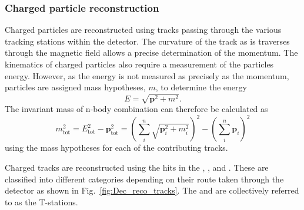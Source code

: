 \subsubsection{Charged particle reconstruction}
Charged particles are reconstructed using tracks passing through the various tracking stations within the \lhcb detector. The curvature of the track as is traverses through the magnetic field allows a precise determination of the momentum. The kinematics of charged particles also require a measurement of the particles energy. However, as the energy is not measured as precisely as the momentum, particles are assigned mass hypotheses, $m$, to determine the energy
\begin{equation}
E = \sqrt{\boldsymbol{p}^{2}+m^{2}}.
\end{equation} 
The invariant mass of n-body combination can therefore be calculated as
\begin{equation}
m^{2}_\text{tot} = E_{\text{tot}}^{2} - \boldsymbol{p}_\text{tot}^2 = \left(\sum^{n}_{i} \sqrt{\boldsymbol{p}_{i}^{2}+m_{i}^{2}}\right)^{2} - \left(\sum^{n}_{i} \boldsymbol{p}_{i}\right)^2
\end{equation}
using the mass hypotheses for each of the contributing tracks.

Charged tracks are reconstructed using the hits in the \velo, \ttracker, \intr and \ot. These are classified into different categories depending on their route taken through the detector as shown in Fig.~\ref{fig:Dec_reco_tracks}. The \intr and \ot are collectively referred to as the T-stations. 

